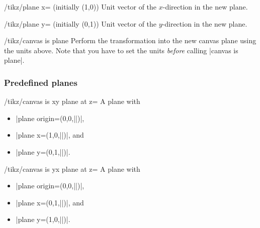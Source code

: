 \begin{key}{/tikz/plane x= (initially {(1,0)})}
    Unit vector of the $x$-direction in the new plane.
\end{key}

\begin{key}{/tikz/plane y= (initially {(0,1)})}
    Unit vector of the $y$-direction in the new plane.
\end{key}

\begin{key}{/tikz/canvas is plane}
    Perform the transformation into the new canvas plane using the units above.
    Note that you have to set the units \emph{before} calling
    |canvas is plane|.
\begin{codeexample}[preamble={\usetikzlibrary{3d}}]
\end{codeexample}
\end{key}


\subsubsection{Predefined planes}

\begin{key}{/tikz/canvas is xy plane at z=}
    A plane with
    \begin{itemize}
        \item |plane origin={(0,0,||)}|,
        \item |plane x={(1,0,||)}|, and
        \item |plane y={(0,1,||)}|.
    \end{itemize}
\end{key}

\begin{key}{/tikz/canvas is yx plane at z=}
    A plane with
    \begin{itemize}
        \item |plane origin={(0,0,||)}|,
        \item |plane x={(0,1,||)}|, and
        \item |plane y={(1,0,||)}|.
    \end{itemize}
\end{key}

